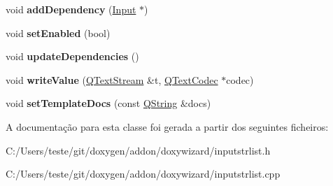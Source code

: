 \begin{DoxyCompactItemize}
\item 
\hypertarget{class_input_str_list_a8bbd578a6cbf94a9a9250d0969df2dee}{void {\bfseries add\-Dependency} (\hyperlink{class_input}{Input} $\ast$)}\label{class_input_str_list_a8bbd578a6cbf94a9a9250d0969df2dee}

\item 
\hypertarget{class_input_str_list_ac34148588ffb4fc781ecfff97baa742c}{void {\bfseries set\-Enabled} (bool)}\label{class_input_str_list_ac34148588ffb4fc781ecfff97baa742c}

\item 
\hypertarget{class_input_str_list_a37cd3bc28aa6e7a7845bbaca9b007da2}{void {\bfseries update\-Dependencies} ()}\label{class_input_str_list_a37cd3bc28aa6e7a7845bbaca9b007da2}

\item 
\hypertarget{class_input_str_list_a9a9359fba2cb1dfbac6a19e36adbadf9}{void {\bfseries write\-Value} (\hyperlink{class_q_text_stream}{Q\-Text\-Stream} \&t, \hyperlink{class_q_text_codec}{Q\-Text\-Codec} $\ast$codec)}\label{class_input_str_list_a9a9359fba2cb1dfbac6a19e36adbadf9}

\item 
\hypertarget{class_input_str_list_a3736660c3a13fe78902eb7a843e7eb3f}{void {\bfseries set\-Template\-Docs} (const \hyperlink{class_q_string}{Q\-String} \&docs)}\label{class_input_str_list_a3736660c3a13fe78902eb7a843e7eb3f}

\end{DoxyCompactItemize}


A documentação para esta classe foi gerada a partir dos seguintes ficheiros\-:\begin{DoxyCompactItemize}
\item 
C\-:/\-Users/teste/git/doxygen/addon/doxywizard/inputstrlist.\-h\item 
C\-:/\-Users/teste/git/doxygen/addon/doxywizard/inputstrlist.\-cpp\end{DoxyCompactItemize}
